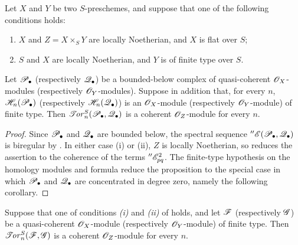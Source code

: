 \begin{proposition}[6.5.13]
\label{III.6.5.13}
Let $X$ and $Y$ be two $S$-preschemes, and suppose that one of
the following conditions holds:
\begin{enumerate}
  \item[\textup{(i)}] $X$ and $Z=X\times_SY$ are locally Noetherian, and
    $X$ is flat over $S$;
  \item[\textup{(ii)}] $S$ and $X$ are locally Noetherian, and $Y$ is of
    finite type over $S$.
\end{enumerate}
Let $\mathscr{P}_\bullet$ \textup{(respectively} $\mathscr{Q}_\bullet$) be a
bounded-below complex of quasi-coherent $\mathscr{O}_X$-modules
\textup{(respectively} $\mathscr{O}_Y$-modules).  Suppose in addition that, for
every $n$, $\mathscr{H}_n(\mathscr{P}_\bullet)$ \textup{(respectively}
$\mathscr{H}_n(\mathscr{Q}_\bullet)$) is an $\mathscr{O}_X$-module
\textup{(respectively} $\mathscr{O}_Y$-module) of finite type.  Then $\mathscr{T}\!\mathit{or}_n^S(\mathscr{P}_\bullet,\mathscr{Q}_\bullet)$
is a coherent $\mathscr{O}_Z$-module for every $n$.
\end{proposition}

\begin{proof}
Since $\mathscr{P}_\bullet$ and $\mathscr{Q}_\bullet$ are bounded below, the
spectral sequence
$''\mathscr{E}(\mathscr{P}_\bullet,\mathscr{Q}_\bullet)$ is biregular by
.  In either case (i) or (ii), $Z$ is locally
Noetherian, so  reduces the assertion to the
coherence of the terms $''\mathscr{E}_{pq}^2$.  The finite-type
hypothesis on the homology modules and formula
 reduce the proposition to the special case in
which $\mathscr{P}_\bullet$ and $\mathscr{Q}_\bullet$ are concentrated in
degree zero, namely the following corollary.
\end{proof}

\begin{corollary}[6.5.14]
\label{III.6.5.14}
Suppose that one of conditions \emph{(i)} and \emph{(ii)} of
 holds, and let $\mathscr{F}$ \textup{(respectively} $\mathscr{G}$)
be a quasi-coherent $\mathscr{O}_X$-module \textup{(respectively}
$\mathscr{O}_Y$-module) of finite type.  Then
$\mathscr{T}\!\mathit{or}_n^S(\mathscr{F},\mathscr{G})$ is a coherent $\mathscr{O}_Z$-module for
every $n$.
\end{corollary}

